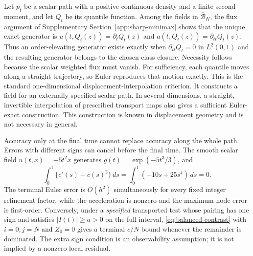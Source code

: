 Let $p_t$ be a scalar path with a positive continuous density and a finite
second moment, and let $Q_t$ be its quantile function. Among the fields in
$\overline{\mathcal B}_K$, the flux argument of Supplementary
Section~\ref{app:sharp-minimax} shows that the unique exact generator is
$u(t,Q_t(z))=\partial_tQ_t(z)$ and
$a(t,Q_t(z))=\partial_{tt}Q_t(z)$.
Thus an order-elevating generator exists exactly when
$\partial_{tt}Q_t=0$ in $L^2(0,1)$ and the resulting generator belongs to
the chosen class closure. Necessity follows because the scalar weighted flux must vanish.
For sufficiency, each quantile moves along a straight trajectory, so Euler
reproduces that motion exactly. This is the standard one-dimensional
displacement-interpolation criterion. It constructs a field for an
externally specified scalar path. In several dimensions, a straight,
invertible interpolation of prescribed transport maps also gives a
sufficient Euler-exact construction. This construction is known in
displacement geometry and is not necessary in general.

Accuracy only at the final time cannot replace accuracy along the whole
path. Errors with different signs can cancel before the final time. The smooth
scalar field $u(t,x)=-5t^2x$ generates $g(t)=\exp(-5t^3/3)$, and
\[
 \int_0^1\{c'(s)+c(s)^2\}\,ds
 =\int_0^1(-10s+25s^4)\,ds=0.
\]
The terminal Euler error is $O(h^2)$ simultaneously for every fixed
integer refinement factor, while the acceleration is nonzero and the
maximum-node error is first-order. Conversely, under a \emph{specified}
transported test whose pairing has one sign and satisfies $|I(t)|\ge a>0$
on the full interval, \eqref{eq:balanced-contrast} with $i=0,j=N$ and
$Z_0=0$ gives a terminal $c/N$ bound whenever the remainder is dominated.
The extra sign condition is an observability assumption; it is not implied
by a nonzero local residual.
